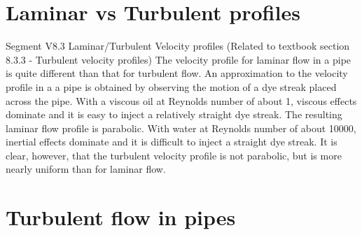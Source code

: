 \section{Laminar vs Turbulent profiles}
Segment V8.3 Laminar/Turbulent Velocity profiles (Related to textbook section 8.3.3 - Turbulent velocity profiles) The velocity profile for laminar flow in a pipe is quite different than that for turbulent flow. An approximation to the velocity profile in a a pipe is obtained by observing the motion of a dye streak placed across the pipe. With a viscous oil at Reynolds number of about 1, viscous effects dominate and it is easy to inject a relatively straight dye streak. The resulting laminar flow profile is parabolic. With water at Reynolds number of about 10000, inertial effects dominate and it is difficult to inject a straight dye streak. It is clear, however, that the turbulent velocity profile is not parabolic, but is more nearly uniform than for laminar flow.
\section{Turbulent flow in pipes}
